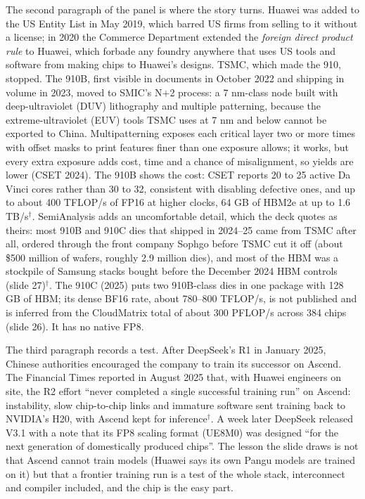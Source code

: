 \documentclass[11pt,letterpaper]{article}
\begin{document}
The second paragraph of the panel is where the story turns. Huawei was added to the US Entity List in May 2019, which barred US firms from selling to it without a license; in 2020 the Commerce Department extended the \emph{foreign direct product rule} to Huawei, which forbade any foundry anywhere that uses US tools and software from making chips to Huawei's designs. TSMC, which made the 910, stopped. The 910B, first visible in documents in October 2022 and shipping in volume in 2023, moved to SMIC's N$+$2 process: a 7 nm-class node built with deep-ultraviolet (DUV) lithography and multiple patterning, because the extreme-ultraviolet (EUV) tools TSMC uses at 7 nm and below cannot be exported to China. Multipatterning exposes each critical layer two or more times with offset masks to print features finer than one exposure allows; it works, but every extra exposure adds cost, time and a chance of misalignment, so yields are lower (CSET 2024). The 910B shows the cost: CSET reports 20 to 25 active Da Vinci cores rather than 30 to 32, consistent with disabling defective ones, and up to about 400 TFLOP/s of FP16 at higher clocks, 64 GB of HBM2e at up to 1.6 TB/s$^\dagger$. SemiAnalysis adds an uncomfortable detail, which the deck quotes as theirs: most 910B and 910C dies that shipped in 2024--25 came from TSMC after all, ordered through the front company Sophgo before TSMC cut it off (about \$500 million of wafers, roughly 2.9 million dies), and most of the HBM was a stockpile of Samsung stacks bought before the December 2024 HBM controls (slide 27)$^\dagger$. The 910C (2025) puts two 910B-class dies in one package with 128 GB of HBM; its dense BF16 rate, about 780--800 TFLOP/s, is not published and is inferred from the CloudMatrix total of about 300 PFLOP/s across 384 chips (slide 26). It has no native FP8.

The third paragraph records a test. After DeepSeek's R1 in January 2025, Chinese authorities encouraged the company to train its successor on Ascend. The Financial Times reported in August 2025 that, with Huawei engineers on site, the R2 effort ``never completed a single successful training run'' on Ascend: instability, slow chip-to-chip links and immature software sent training back to NVIDIA's H20, with Ascend kept for inference$^\dagger$. A week later DeepSeek released V3.1 with a note that its FP8 scaling format (UE8M0) was designed ``for the next generation of domestically produced chips''. The lesson the slide draws is not that Ascend cannot train models (Huawei says its own Pangu models are trained on it) but that a frontier training run is a test of the whole stack, interconnect and compiler included, and the chip is the easy part.
\end{document}
